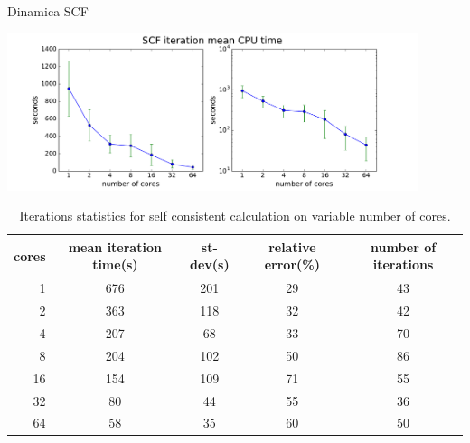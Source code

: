 \documentclass[8pt]{beamer}
\begin{document}
\begin{frame}{Dinamica SCF}
	\begin{center}
		\includegraphics[width=0.9\textwidth]{iterstats.pdf}
	\end{center}
	
	
\begin{table}[hhh!]
\begin{center}
\begin{tabular}{r|cccc}
\toprule
cores &        mean iteration time(s) &         st-dev(s) &   relative error(\%) &   number of iterations \\
\midrule
1  &  676 &  201 &  29 &  43 \\
2  &  363 &  118 &  32 &  42 \\
4  &  207 &   68 &  33 &  70 \\
8  &  204 &  102 &  50 &  86 \\
16 &  154 &  109 &  71 &  55 \\
32 &   80 &   44 &  55 &  36 \\
64 &   58 &   35 &  60 &  50 \\
\bottomrule
\end{tabular}
\end{center}
\caption{Iterations statistics for self consistent calculation on variable number of cores.}
\label{tab:iterations}
\end{table}

\end{frame}
\end{document}
